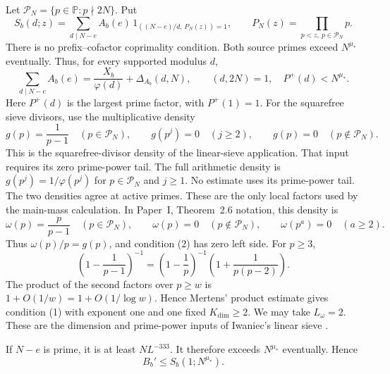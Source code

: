 Let \(\mathcal P_N=\{p\in\mathbb P:p\nmid2N\}\).
Put
\begin{equation}\label{eq:k2-sifted-source}
 S_b(d;z)=\sum_{d\mid N-e}A_b(e)\,1_{((N-e)/d,\,P_N(z))=1},\qquad
 P_N(z)=\prod_{p<z,\ p\in\mathcal P_N}p .
\end{equation}
There is no prefix--cofactor coprimality condition.
Both source primes exceed \(N^{\mu_*}\) eventually.
Thus, for every supported modulus \(d\),
\begin{equation}\label{eq:k2-local-density}
 \sum_{d\mid N-e}A_b(e)
 =\frac{X_b}{\varphi(d)}+\Delta_{A_b}(d,N),\qquad
 (d,2N)=1,\quad P^+(d)<N^{\mu_*}.
\end{equation}
Here \(P^+(d)\) is the largest prime factor, with \(P^+(1)=1\).
For the squarefree sieve divisors, use the multiplicative density
\begin{equation}\label{eq:k2-squarefree-density}
 g(p)=\frac1{p-1}\quad(p\in\mathcal P_N),\qquad
 g(p^j)=0\quad(j\ge2),\qquad
 g(p)=0\quad(p\notin\mathcal P_N).
\end{equation}
This is the squarefree-divisor density of the linear-sieve application.
That input requires its zero prime-power tail. The
full arithmetic density is \(g(p^j)=1/\varphi(p^j)\) for
\(p\in\mathcal P_N\) and \(j\ge1\). No estimate uses its prime-power
tail. The two densities agree at active primes. These are the only local
factors used by the main-mass calculation.
In Paper~I, Theorem~2.6 notation, this density is
\[
 \omega(p)=\frac p{p-1}\quad(p\in\mathcal P_N),\qquad
 \omega(p)=0\quad(p\notin\mathcal P_N),\qquad
 \omega(p^a)=0\quad(a\ge2).
\]
Thus \(\omega(p)/p=g(p)\), and condition (2) has zero left side. For
\(p\ge3\),
\[
 \left(1-\frac1{p-1}\right)^{-1}
 =\left(1-\frac1p\right)^{-1}
   \left(1+\frac1{p(p-2)}\right).
\]
The product of the second factors over \(p\ge w\) is
\(1+O(1/w)=1+O(1/\log w)\). Hence Mertens' product estimate gives
condition (1) with exponent one and one fixed \(K_{\mathrm{dim}}\ge2\).
We may take \(L_{\omega}=2\). These are the dimension and prime-power
inputs of Iwaniec's linear sieve \cite{Iwaniec1980Remainder}.

If \(N-e\) is prime, it is at least \(NL^{-333}\).
It therefore exceeds \(N^{\mu_*}\) eventually.
Hence
\begin{equation}\label{eq:k2-source-comparison}
 B_b'\le S_b(1;N^{\mu_*}).
\end{equation}

